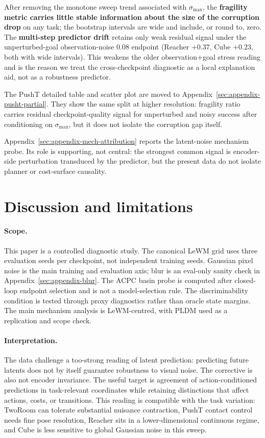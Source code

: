\documentclass[10pt]{article}
\newcommand{\stdmax}{\ensuremath{\sigma_{\max}}}
\newcommand{\fragility}{fragility ratio}
\begin{document}
After removing the monotone sweep trend associated with \stdmax{}, the \textbf{fragility metric carries little stable information about the size of the corruption drop} on any task; the bootstrap intervals are wide and include, or round to, zero. The \textbf{multi-step predictor drift} retains only weak residual signal under the unperturbed-goal observation-noise 0.08 endpoint (Reacher $+0.37$, Cube $+0.23$, both with wide intervals). This weakens the older observation+goal stress reading and is the reason we treat the cross-checkpoint diagnostic as a local explanation aid, not as a robustness predictor.

The PushT detailed table and scatter plot are moved to Appendix~\ref{sec:appendix-pusht-partial}. They show the same split at higher resolution: \fragility{} carries residual checkpoint-quality signal for unperturbed and noisy success after conditioning on \stdmax{}, but it does not isolate the corruption gap itself.

Appendix~\ref{sec:appendix-mech-attribution} reports the latent-noise mechanism probe. Its role is supporting, not central: the strongest common signal is encoder-side perturbation transduced by the predictor, but the present data do not isolate planner or cost-surface causality.

\section{Discussion and limitations}\label{sec:disc}

\paragraph{Scope.}
This paper is a controlled diagnostic study. The canonical LeWM grid uses three evaluation seeds per checkpoint, not independent training seeds. Gaussian pixel noise is the main training and evaluation axis; blur is an eval-only sanity check in Appendix~\ref{sec:appendix-blur}. The ACPC basin probe is computed after closed-loop endpoint selection and is not a model-selection rule. The discriminability condition is tested through proxy diagnostics rather than oracle state margins. The main mechanism analysis is LeWM-centred, with PLDM used as a replication and scope check.

\paragraph{Interpretation.}
The data challenge a too-strong reading of latent prediction: predicting future latents does not by itself guarantee robustness to visual noise. The corrective is also not encoder invariance. The useful target is agreement of action-conditioned predictions in task-relevant coordinates while retaining distinctions that affect actions, costs, or transitions. This reading is compatible with the task variation: TwoRoom can tolerate substantial nuisance contraction, PushT contact control needs fine pose resolution, Reacher sits in a lower-dimensional continuous regime, and Cube is less sensitive to global Gaussian noise in this sweep.
\end{document}
